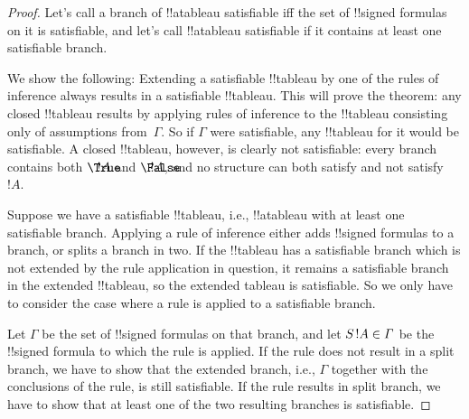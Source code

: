 \documentclass[../../../include/open-logic-section]{subfiles}
\begin{document}
\begin{proof}
Let's call a branch of !!a{tableau} satisfiable iff the set of
!!{signed formula}s on it is satisfiable, and let's call !!a{tableau}
satisfiable if it contains at least one satisfiable branch.

We show the following: Extending a satisfiable !!{tableau} by one of
the rules of inference always results in a satisfiable !!{tableau}.
This will prove the theorem: any closed !!{tableau} results by
applying rules of inference to the !!{tableau} consisting only of
assumptions from~$\Gamma$. So if $\Gamma$ were satisfiable, any
!!{tableau} for it would be satisfiable. A closed !!{tableau},
however, is clearly not satisfiable: every branch contains both
$\sFmla{\True}{!A}$ and $\sFmla{\False}{!A}$, and no structure can
both satisfy and not satisfy~$!A$.

Suppose we have a satisfiable !!{tableau}, i.e., !!a{tableau} with at
least one satisfiable branch. Applying a rule of inference either adds
!!{signed formula}s to a branch, or splits a branch in two. If the
!!{tableau} has a satisfiable branch which is not extended by the rule
application in question, it remains a satisfiable branch in the
extended !!{tableau}, so the extended tableau is satisfiable. So we
only have to consider the case where a rule is applied to a
satisfiable branch.

Let $\Gamma$ be the set of !!{signed formula}s on that branch, and
let $\sFmla{S}{!A} \in \Gamma$ be the !!{signed formula} to which the
rule is applied. If the rule does not result in a split branch, we
have to show that the extended branch, i.e., $\Gamma$ together with
the conclusions of the rule, is still satisfiable. If the rule results
in split branch, we have to show that at least one of the two
resulting branches is satisfiable.
  

\end{proof}
\end{document}
